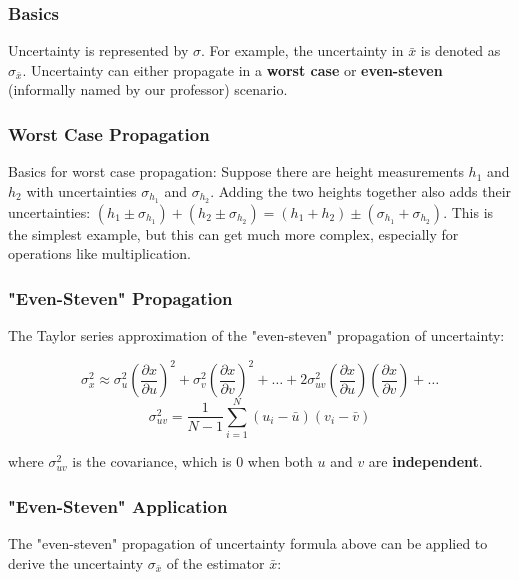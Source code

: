 \subsubsection{Basics}

Uncertainty is represented by $\sigma$. For example, the uncertainty in $\bar{x}$ is denoted as $\sigma_{\bar x}$. Uncertainty can either propagate in a \textbf{worst case} or \textbf{even-steven} (informally named by our professor) scenario.

\subsubsection{Worst Case Propagation}

Basics for worst case propagation: Suppose there are height measurements $h_1$ and $h_2$ with uncertainties $\sigma_{h_1}$ and $\sigma_{h_2}$. Adding the two heights together also adds their uncertainties: $(h_1 \pm \sigma_{h_1}) + (h_2 \pm \sigma_{h_2}) = (h_1 + h_2) \pm (\sigma_{h_1} + \sigma_{h_2})$. This is the simplest example, but this can get much more complex, especially for operations like multiplication.

\subsubsection{"Even-Steven" Propagation}

The Taylor series approximation of the "even-steven" propagation of uncertainty:

\begin{equation*}
    \sigma_{x}^2 \approx \sigma_u^2\left(\frac{\partial x}{\partial u}\right)^2 + \sigma_v^2\left(\frac{\partial x}{\partial v}\right)^2 + \dots + 2\sigma_{uv}^2\left(\frac{\partial x}{\partial u}\right)\left(\frac{\partial x}{\partial v}\right) + \dots
\end{equation*}
\begin{equation*}
    \sigma_{uv}^2 = \frac{1}{N-1} \sum_{i=1}^N (u_i - \bar{u})(v_i - \bar{v})
\end{equation*}

where $\sigma_{uv}^2$ is the covariance, which is 0 when both $u$ and $v$ are \textbf{independent}.

\subsubsection{"Even-Steven" Application}

The "even-steven" propagation of uncertainty formula above can be applied to derive the uncertainty $\sigma_{\bar{x}}$ of the estimator $\bar{x}$:

